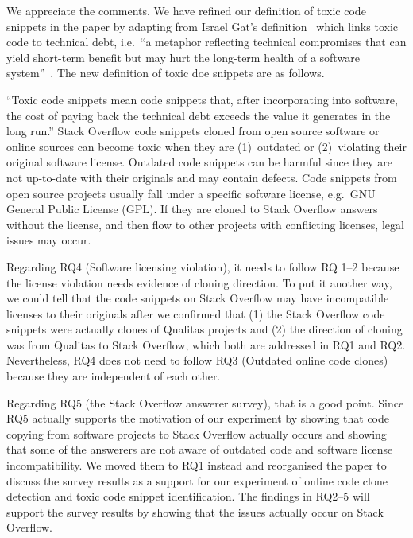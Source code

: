 \documentclass[a4paper,twoside,10pt]{reviewresponse}
\begin{document}
We appreciate the comments. We have refined our definition of toxic code snippets in the paper by adapting from Israel Gat's definition~\citep{toxiccode} which links toxic code to technical debt, i.e.~``a metaphor reflecting technical compromises that can yield short-term benefit but may hurt the long-term health of a software system''~\citep{Li2015}. The new definition of toxic doe snippets are as follows.

``Toxic code snippets mean code snippets that, after incorporating into software,
the cost of paying back the technical debt exceeds the value it generates in the long run.'' 
Stack Overflow code snippets
cloned from open source software or online sources can become toxic when they
are (1)~outdated or (2)~violating their original software
license. Outdated code snippets
can be harmful since they are not up-to-date with their originals and may
contain defects. Code snippets from open source projects usually fall under a
specific software license, e.g.\ GNU General Public License (GPL). If they are
cloned to Stack Overflow answers without the license, and then flow to other projects
with conflicting licenses, legal issues may occur.
 

Regarding RQ4 (Software licensing violation), it needs to follow RQ 1--2 because the license violation needs evidence of cloning direction. To put it another way, we could tell that the code snippets on Stack Overflow may have incompatible licenses to their originals after we confirmed that (1) the Stack Overflow code snippets were actually clones of Qualitas projects and (2) the direction of cloning was from Qualitas to Stack Overflow, which both are addressed in RQ1 and RQ2.
Nevertheless, RQ4 does not need to follow RQ3 (Outdated online code clones) because they are independent of each other.

Regarding RQ5 (the Stack Overflow answerer survey), that is a good point. Since RQ5 actually supports the motivation of our experiment by showing that code copying from software projects to Stack Overflow actually occurs and showing that some of the answerers are not aware of outdated code and software license incompatibility. We moved them to RQ1 instead and reorganised the paper to discuss the survey results as a support for our experiment of online code clone detection and toxic code snippet identification. The findings in RQ2--5 will support the survey results by showing that the issues actually occur on Stack Overflow.
\end{document}
